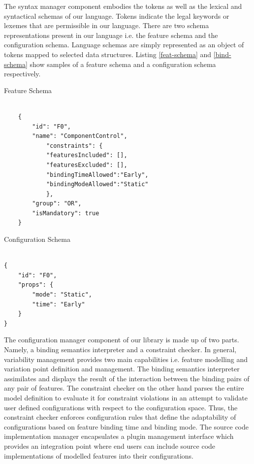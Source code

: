 \documentclass[conference]{IEEEtran}
\begin{document}
The syntax manager component embodies the tokens as well as the lexical and syntactical schemas of our language. Tokens indicate the legal keywords or lexemes that are permissible in our language. There are two schema representations present in our language i.e. the feature schema and the configuration schema. Language schemas are simply represented as an object of tokens mapped to selected data structures. Listing \ref{feat-schema} and \ref{bind-schema} show samples of a feature schema and a configuration schema respectively.

\begin{listing}
\caption{Feature Schema}
\begin{verbatim}

    {
        "id": "F0",
        "name": "ComponentControl",
            "constraints": {
            "featuresIncluded": [],
            "featuresExcluded": [],
            "bindingTimeAllowed":"Early",
            "bindingModeAllowed":"Static"
            },
        "group": "OR",
        "isMandatory": true
    }

\end{verbatim}
\label{feat-schema}
\end{listing}

\begin{listing}
\caption{Configuration Schema}
\begin{verbatim}

{
    "id": "F0",
    "props": {
        "mode": "Static",
        "time": "Early"
    }
}
\end{verbatim}
\label{bind-schema}
\end{listing}

The configuration manager component of our library is made up of two parts. Namely, a binding semantics interpreter and a constraint checker. In general, variability management provides two main capabilities i.e. feature modelling and variation point definition and management. The binding semantics interpreter assimilates and displays the result of the interaction between the binding pairs of any pair of features. The constraint checker on the other hand parses the entire model definition to evaluate it for constraint violations in an attempt to validate user defined configurations with respect to the configuration space. Thus, the constraint checker enforces configuration rules that define the adaptability of configurations based on feature binding time and binding mode.
The source code implementation manager encapsulates a plugin management interface which provides an integration point where end users can include source code implementations of modelled features into their configurations.
\end{document}
